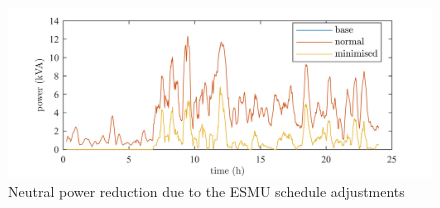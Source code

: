 \begin{figure}\centering
	\includegraphics{_chapter1/fig/results/ts-neutral-power_}
\caption{Neutral power reduction due to the ESMU schedule adjustments}
\label{ch1:fig:ts-neutral-power}
\end{figure}